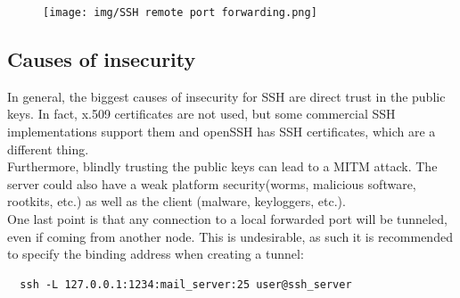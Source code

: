 \begin{figure}[H]
  \centering
  \texttt{[image: img/SSH remote port
  forwarding.png]}
\end{figure}

\subsection{Causes of insecurity}
In general, the biggest causes of insecurity for SSH are direct trust
in the public keys. In fact, x.509 certificates are not used, but some
commercial SSH implementations support them and openSSH has SSH 
certificates, which are a different thing.\\
Furthermore, blindly trusting the public keys can lead to a MITM 
attack. The server could also have a weak platform security(worms,
malicious software, rootkits, etc.) as well as the client (malware,
keyloggers, etc.).\\
One last point is that any connection to a local forwarded port will
be tunneled, even if coming from another node. This is undesirable, as
such it is recommended to specify the binding address when creating a
tunnel:
\begin{verbatim}
  ssh -L 127.0.0.1:1234:mail_server:25 user@ssh_server
\end{verbatim}

